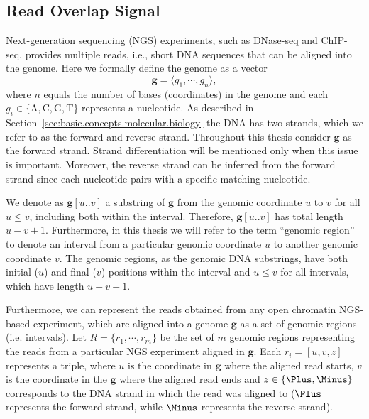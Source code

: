 \subsection{Read Overlap Signal}
\label{sec:read.overlap.signal}

Next-generation sequencing (NGS) experiments, such as DNase-seq and ChIP-seq, provides multiple reads, i.e., short DNA sequences that can be aligned into the genome. Here we formally define the genome as a vector
\begin{equation}
  \label{eq:genome}
  \mathbf{g} = \langle {g}_{1}, \cdots, {g}_{n} \rangle,
\end{equation}
where $n$ equals the number of bases (coordinates) in the genome and each ${g}_{i} \in \{\text{A}, \text{C}, \text{G}, \text{T}\}$ represents a nucleotide. As described in Section~\ref{sec:basic.concepts.molecular.biology} the DNA has two strands, which we refer to as the forward and reverse strand. Throughout this thesis consider $\mathbf{g}$ as the forward strand. Strand differentiation will be mentioned only when this issue is important. Moreover, the reverse strand can be inferred from the forward strand since each nucleotide pairs with a specific matching nucleotide.

We denote as $\mathbf{g}[u..v]$ a substring of $\mathbf{g}$ from the genomic coordinate $u$ to $v$ for all $u \leq v$, including both within the interval. Therefore, $\mathbf{g}[u..v]$ has total length $u-v+1$. Furthermore, in this thesis we will refer to the term ``genomic region'' to denote an interval from a particular genomic coordinate $u$ to another genomic coordinate $v$. The genomic regions, as the genomic DNA substrings, have both initial ($u$) and final ($v$) positions within the interval and $u \leq v$ for all intervals, which have length $u-v+1$.

Furthermore, we can represent the reads obtained from any open chromatin NGS-based experiment, which are aligned into a genome $\mathbf{g}$ as a set of genomic regions (i.e. intervals). Let $ R = \{ {r}_{1}, \cdots, {r}_{m} \}$ be the set of $m$ genomic regions representing the reads from a particular NGS experiment aligned in $\mathbf{g}$. Each ${r}_{i} = [u, v, z]$ represents a triple, where $u$ is the coordinate in $\mathbf{g}$ where the aligned read starts, $v$ is the coordinate in the $\mathbf{g}$ where the aligned read ends and $z \in \{\Plus, \Minus\}$ corresponds to the DNA strand in which the read was aligned to ($\Plus$ represents the forward strand, while $\Minus$ represents the reverse strand).

